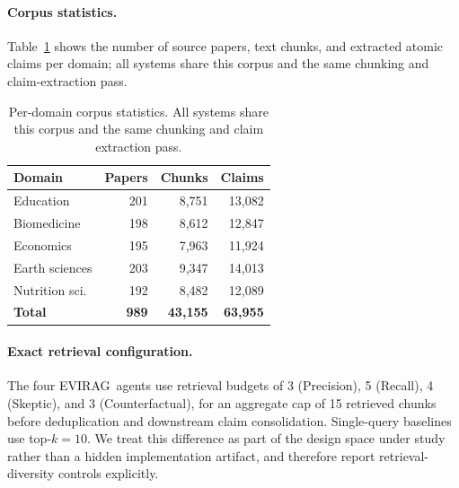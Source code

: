 \documentclass[11pt]{article}
\newcommand{\system}{\textsc{EVIRAG}\xspace}
\begin{document}
\paragraph{Corpus statistics.}
Table~\ref{tab:corpus} shows the number of source papers, text chunks,
and extracted atomic claims per domain; all systems share this corpus
and the same chunking and claim-extraction pass.
\begin{table}[h]
\centering\small
\setlength{\tabcolsep}{4pt}
\begin{tabular}{@{}lrrr@{}}
\toprule
\textbf{Domain} & \textbf{Papers} & \textbf{Chunks} & \textbf{Claims} \\
\midrule
Education        & 201 & 8{,}751  & 13{,}082 \\
Biomedicine      & 198 & 8{,}612  & 12{,}847 \\
Economics        & 195 & 7{,}963  & 11{,}924 \\
Earth sciences   & 203 & 9{,}347  & 14{,}013 \\
Nutrition sci.   & 192 & 8{,}482  & 12{,}089 \\
\midrule
\textbf{Total}   & \textbf{989} & \textbf{43{,}155} & \textbf{63{,}955} \\
\bottomrule
\end{tabular}
\caption{Per-domain corpus statistics.  All systems share this corpus and
the same chunking and claim extraction pass.}
\label{tab:corpus}
\end{table}

\paragraph{Exact retrieval configuration.}
The four \system\ agents use retrieval budgets of 3 (Precision), 5 (Recall), 4
(Skeptic), and 3 (Counterfactual), for an aggregate cap of 15 retrieved chunks
before deduplication and downstream claim consolidation.  Single-query
baselines use top-$k{=}10$.  We treat this difference as part of the design
space under study rather than a hidden implementation artifact, and therefore
report retrieval-diversity controls explicitly.
\end{document}
